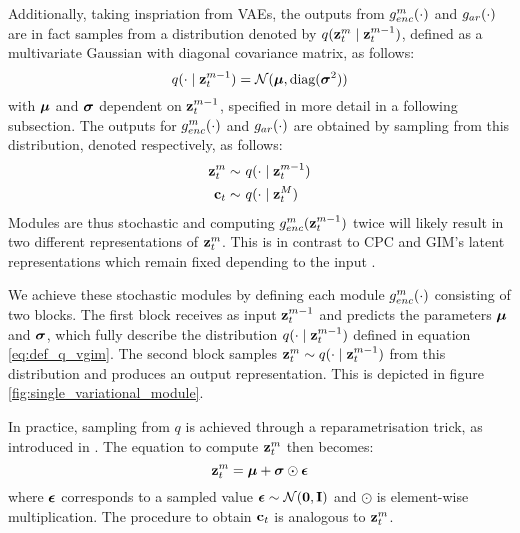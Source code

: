 			Additionally, taking inspriation from VAEs, the outputs from $g_{enc}^m(\cdot)$ and $g_{ar}(\cdot)$ are in fact samples from a distribution denoted by $q(\mathbf{z}_t^m \mid \mathbf{z}_t^{m-1})$, defined as a multivariate Gaussian with diagonal covariance matrix, as follows:
			\begin{equation}
				q(\cdot \mid \mathbf{z}_t^{m-1}) = \mathcal{N}(\bm{\mu}, \text{diag}(\bm{\sigma}^2)) \label{eq:def_q_vgim}
			\end{equation}
			with $\bm{\mu}$ and $\bm{\sigma}$ dependent on $\mathbf{z}_t^{m-1}$, specified in more detail in a following subsection.
			The outputs for $g_{enc}^m(\cdot)$ and $g_{ar}(\cdot)$ are obtained by sampling from this distribution, denoted respectively, as follows:
 			\begin{align} %
			 	\sample{\zt^m}~ & \qfromzmneg  \label{eq:sample_z_from_q} \\
			 	\sample{\ct}~ & \qfromzM
			 \end{align}
			Modules are thus stochastic and computing $g_{enc}^m(\mathbf{z}_t^{m-1})$ twice will likely result in two different representations of $\mathbf{z}_t^m$. This is in contrast to CPC and GIM's latent representations which remain fixed depending to the input \cite{oordRepresentationLearningContrastive2019, lowePuttingEndEndtoEnd2020}.
		
			We achieve these stochastic modules by defining each module $g_{enc}^m(\cdot)$ consisting of two blocks. The first block receives as input $\mathbf{z}_t^{m-1}$ and predicts the parameters $\bm{\mu}$ and $\bm{\sigma}$, which fully describe the distribution $q(\cdot \mid \mathbf{z}_t^{m-1})$ defined in equation \ref{eq:def_q_vgim}. The second block samples $\mathbf{z}_t^m \sim q(\cdot \mid \mathbf{z}_t^{m-1})$ from this distribution and produces an output representation. This is depicted in figure \ref{fig:single_variational_module}.
			
			
			
			In practice, sampling from $q$ is achieved through a reparametrisation trick, as introduced in \cite{kingmaAutoEncodingVariationalBayes2022}. The equation to compute $\mathbf{z}_t^m$ then becomes:
			\begin{equation*}
				\mathbf{z}_t^m = \bm{\mu} + \bm{\sigma} \odot \bm{\epsilon}
			\end{equation*}
			where $\bm{\epsilon}$ corresponds to a sampled value $\bm{\epsilon} \sim \mathcal{N}(\bm{\mathbf{0}}, \mathbf{I})$ and $\odot$ is element-wise multiplication. The procedure to obtain $\mathbf{c}_t$ is analogous to $\mathbf{z}_t^m$.
			
